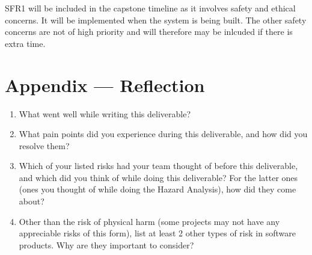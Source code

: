 \documentclass{article}
\begin{document}
SFR1 will be included in the capstone timeline as it involves safety and 
ethical concerns. It will be implemented when the system is being built. The 
other safety concerns are not of high priority and will therefore may be 
inlcuded if there is extra time.

\newpage{}

\section*{Appendix --- Reflection}




\begin{enumerate}
    \item What went well while writing this deliverable? 
    \item What pain points did you experience during this deliverable, and how
    did you resolve them?
    \item Which of your listed risks had your team thought of before this
    deliverable, and which did you think of while doing this deliverable? For
    the latter ones (ones you thought of while doing the Hazard Analysis), how
    did they come about?
    \item Other than the risk of physical harm (some projects may not have any
    appreciable risks of this form), list at least 2 other types of risk in
    software products. Why are they important to consider?
\end{enumerate}
\end{document}
